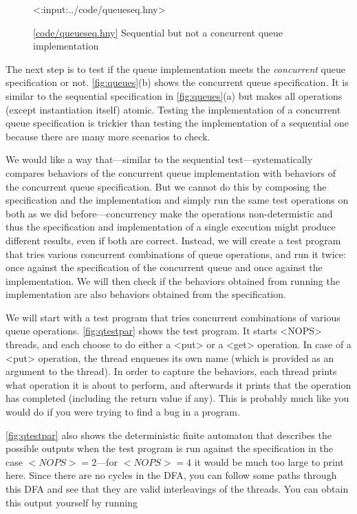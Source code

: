 \documentclass{report}
\newcommand{\harmonylink}[1]{%
[\href{https://harmony.cs.cornell.edu/#1}{\underline{#1}}]%
}
\newenvironment{code}{
\tcolorbox
}{
\endtcolorbox
}
\begin{document}
\begin{figure}
\begin{code}
<{:input:../code/queueseq.hny}>
\end{code}
\caption{\harmonylink{code/queueseq.hny} Sequential but not a concurrent
queue implementation}
\label{fig:queueseq}
\end{figure}

The next step is to test if the queue implementation
meets the \emph{concurrent} queue specification or not.
\autoref{fig:queues}(b) shows the concurrent queue specification.
It is similar to the sequential specification in \autoref{fig:queues}(a)
but makes all operations (except instantiation itself) atomic.
Testing the implementation of a concurrent queue specification is
trickier than testing the implementation of a sequential one because
there are many more scenarios to check.

We would like a way that---similar to the sequential test---systematically
compares behaviors of the
concurrent queue implementation with behaviors of the concurrent
queue specification.  But we cannot do this by composing the specification
and the implementation and simply run the same test operations on both as we
did before---concurrency make the operations non-determistic and thus
the specification and implementation of a single execution might produce
different results, even if both are correct.
Instead, we will create a test program that tries various concurrent
combinations of queue operations, and run it twice: once against the
specification of the concurrent queue and once against the
implementation.  We will then check if the behaviors obtained from
running the implementation are also behaviors obtained
from the specification.

We will start with a test program that tries concurrent combinations
of various queue operations.
\autoref{fig:qtestpar} shows the test program.  It starts
<{NOPS}> threads, and each choose to do either a <{put}>
or a <{get}> operation.  In case of a <{put}> operation,
the thread enqueues its own name (which is provided as an argument
to the thread).  In order to capture the behaviors,
each thread prints what operation it is about to perform,
and afterwards it prints that the operation has
completed (including the return value if any).
This is probably much like you would do if you were trying to find a
bug in a program.

\autoref{fig:qtestpar} also shows the deterministic finite automaton
that describes the possible outputs when the test
program is run against the specification in the case
$<{NOPS}> = 2$---for $<{NOPS}> = 4$ it would be much
too large to print here.  Since there are no cycles in the DFA, you
can follow some paths through this DFA and see that they are valid
interleavings of the threads.
You can obtain this output yourself by running
\end{document}
